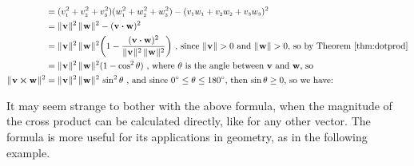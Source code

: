 \begin{align*}
  &= (v_{\scriptscriptstyle 1}^{2} + v_{\scriptscriptstyle 2}^{2} + v_{\scriptscriptstyle 3}^{2})(w_{\scriptscriptstyle 1}^{2} + w_{\scriptscriptstyle 2}^{2} + w_{\scriptscriptstyle 3}^{2}) -
   (v_{\scriptscriptstyle 1}w_{\scriptscriptstyle 1} + v_{\scriptscriptstyle 2}w_{\scriptscriptstyle 2} + v_{\scriptscriptstyle 3}w_{\scriptscriptstyle 3})^2\\
  &= \lVert\mspace{1mu}\mathbf{v}\mspace{1mu}\rVert^2 \, \lVert\mspace{1mu}\mathbf{w}\mspace{1mu}\rVert^2 - (\mathbf{v} \bm{\cdot} \mathbf{w})^2\\
  &= \lVert\mspace{1mu}\mathbf{v}\mspace{1mu}\rVert^2 \, \lVert\mspace{1mu}\mathbf{w}\mspace{1mu}\rVert^2 \biggl( 1 -
   \frac{(\mathbf{v} \bm{\cdot} \mathbf{w})^2}{\lVert\mspace{1mu}\mathbf{v}\mspace{1mu}\rVert^2 \, \lVert\mspace{1mu}\mathbf{w}\mspace{1mu}\rVert^2} \biggr)
   \text{~,~since $\lVert\mspace{1mu}\mathbf{v}\mspace{1mu}\rVert > 0$ and $\lVert\mspace{1mu}\mathbf{w}\mspace{1mu}\rVert > 0$, so by Theorem \ref{thm:dotprod}}\\
  &= \lVert\mspace{1mu}\mathbf{v}\mspace{1mu}\rVert^2 \, \lVert\mspace{1mu}\mathbf{w}\mspace{1mu}\rVert^2 (1 - \cos^2 \theta)
  \text{~,~where $\theta$ is the angle between $\mathbf{v}$ and $\mathbf{w}$, so}\\
  \lVert\mspace{1mu}\mathbf{v} \bm{\times} \mathbf{w}\mspace{1mu}\rVert^2 &= \lVert\mspace{1mu}\mathbf{v}\mspace{1mu}\rVert^2 \, \lVert\mspace{1mu}\mathbf{w}\mspace{1mu}\rVert^2 \, \sin^2 \theta
  \text{~,~and since $0^\circ \le \theta \le 180^\circ$, then $\sin \theta \ge 0$, so we have:}
\end{align*}
\smallskip

It may seem strange to bother with the above formula, when the magnitude of the cross product can be calculated
directly, like for any other vector. The formula is more useful for its applications in geometry, as in the
following example.

